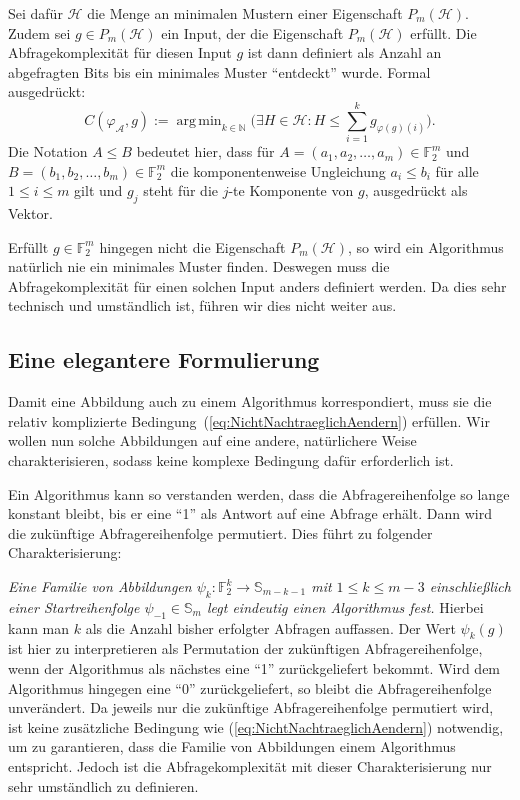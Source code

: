\documentclass[10pt,a4paper, footheight=1mm, bibliography=totoc]{scrreprt}
\theoremstyle{definition}
\DeclareMathOperator*\argmin{arg\,min}
\begin{document}
Sei dafür $\mathcal{H}$ die Menge an minimalen
Mustern einer Eigenschaft $P_m(\mathcal{H})$.
Zudem sei $g\in P_m(\mathcal{H})$ ein Input, der die
Eigenschaft $P_m(\mathcal{H})$ erfüllt.
Die Abfragekomplexität für diesen Input $g$
ist dann definiert als Anzahl an abgefragten Bits
bis ein minimales Muster "`entdeckt"' wurde.
Formal ausgedrückt:
$$ C(\varphi_\mathcal{A}, g) :=
\argmin_{k\in\mathbb{N}} \Big(\exists H\in\mathcal{H}:
H \leq \sum_{i=1}^k g_{\varphi(g)(i)} \Big).
$$
Die Notation $A\leq B$ bedeutet hier, dass
für $A=(a_1, a_2, \dots, a_m)\in \mathbb{F}_2^m$
und $B=(b_1, b_2, \dots, b_m)\in \mathbb{F}_2^m$
die komponentenweise Ungleichung $a_i \leq b_i$
für alle $1\leq i\leq m$ gilt und $g_j$ steht für
die $j$-te Komponente von $g$, ausgedrückt als
Vektor.

Erfüllt $g\in\mathbb{F}_2^m$ hingegen nicht die
Eigenschaft $P_m(\mathcal{H})$, so wird ein Algorithmus
natürlich nie ein minimales Muster finden. Deswegen
muss die Abfragekomplexität für einen solchen
Input anders definiert werden. Da dies sehr 
technisch und umständlich ist, führen wir
dies nicht weiter aus.

\subsection{Eine elegantere Formulierung}
Damit eine Abbildung auch zu einem Algorithmus
korrespondiert, muss sie die relativ komplizierte
Bedingung~(\ref{eq:NichtNachtraeglichAendern})
erfüllen. Wir wollen nun solche Abbildungen
auf eine andere, natürlichere
Weise charakterisieren, sodass keine komplexe Bedingung
dafür erforderlich ist.

Ein Algorithmus kann so verstanden werden, dass die
Abfragereihenfolge so lange konstant bleibt, bis er
eine "`1"' als Antwort auf eine Abfrage erhält.
Dann wird die zukünftige Abfragereihenfolge
permutiert. Dies führt zu folgender Charakterisierung:

\emph{Eine Familie von Abbildungen 
$\psi_k:\mathbb{F}_2^k \to \mathbb{S}_{m-k-1}$
mit $1 \leq k \leq m-3$ einschließlich einer Startreihenfolge
$\psi_{-1}\in\mathbb{S}_m$ legt eindeutig einen Algorithmus fest.}
Hierbei kann man $k$ als die Anzahl bisher erfolgter Abfragen
auffassen. Der Wert $\psi_k(g)$ ist hier zu interpretieren
als Permutation der zukünftigen Abfragereihenfolge, wenn
der Algorithmus als nächstes eine "`1"' zurückgeliefert bekommt.
Wird dem Algorithmus hingegen eine "`0"' zurückgeliefert, so
bleibt die Abfragereihenfolge unverändert.
Da jeweils nur die zukünftige Abfragereihenfolge permutiert 
wird, ist keine zusätzliche Bedingung wie 
(\ref{eq:NichtNachtraeglichAendern}) notwendig, um zu garantieren,
dass die Familie von Abbildungen einem Algorithmus entspricht.
Jedoch ist die Abfragekomplexität mit dieser Charakterisierung
nur sehr umständlich zu definieren.
\end{document}
